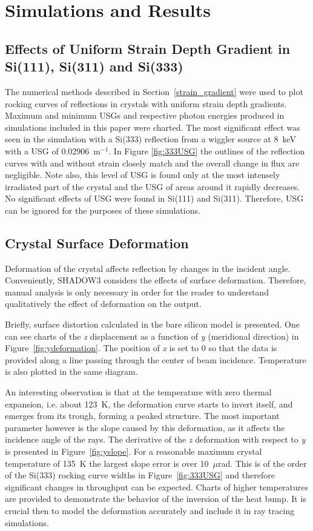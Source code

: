 \documentclass{iucr}
\begin{document}
\section{Simulations and Results}

\subsection{Effects of Uniform Strain Depth Gradient in Si(111), Si(311) and Si(333)}\label{strain_results}
The numerical methods described in Section~\ref{strain_gradient} were used to plot rocking curves of reflections in crystals with uniform strain depth gradients. Maximum and minimum USGs and respective photon energies produced in simulations included in this paper were charted. The most significant effect was seen in the simulation with a Si(333) reflection from a wiggler source at 8~keV with a USG of 0.02906~m$^{-1}$. In Figure \ref{fig:333USG} the outlines of the reflection curves with and without strain closely match and the overall change in flux are negligible. Note also, this level of USG is found only at the most intensely irradiated part of the crystal and the USG of areas around it rapidly decreases. No significant effects of USG were found in Si(111) and Si(311). Therefore, USG can be ignored for the purposes of these simulations.

\subsection{Crystal Surface Deformation}\label{deformation}

Deformation of the crystal affects reflection by changes in the incident angle. Conveniently, SHADOW3 considers the effects of surface deformation. Therefore, manual analysis is only necessary in order for the reader to understand qualitatively the effect of deformation on the output.

Briefly, surface distortion calculated in the bare silicon model is presented. One can see charts of the \textit{z} displacement as a function of \textit{y} (meridional direction) in Figure~\ref{fig:ydeformation}. The position of \textit{x} is set to 0 so that the data is provided along a line passing through the center of beam incidence. Temperature is also plotted in the same diagram.

An interesting observation is that at the temperature with zero thermal expansion, i.e. about 123~K, the deformation curve starts to invert itself, and emerges from its trough, forming a peaked structure. The most important parameter however is the slope caused by this deformation, as it affects the incidence angle of the rays. The derivative of the \textit{z} deformation with respect to \textit{y} is presented in Figure~\ref{fig:yslope}. For a reasonable maximum crystal temperature of 135~K the largest slope error is over 10~$\mu$rad. This is of the order of the Si(333) rocking curve widths in Figure~\ref{fig:333USG} and therefore significant changes in throughput can be expected. Charts of higher temperatures are provided to demonstrate the behavior of the inversion of the heat bump. It is crucial then to model the deformation accurately and include it in ray tracing simulations.
\end{document}
